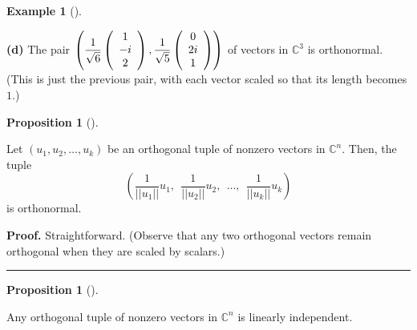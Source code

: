 \documentclass[numbers=enddot,12pt,final,onecolumn,notitlepage]{scrartcl}%
\numberwithin{exer}{subsection}
\theoremstyle{definition}
\newtheorem{prop}[theo]{Proposition}
\newenvironment{proposition}[1][]
{\begin{prop}[#1]\begin{leftbar}}
{\end{leftbar}\end{prop}}
\newtheorem{exam}[theo]{Example}
\newenvironment{example}[1][]
{\begin{exam}[#1]\begin{leftbar}}
{\end{leftbar}\end{exam}}
\newenvironment{proof}[1][Proof]{\noindent\textbf{#1.} }{\ \rule{0.5em}{0.5em}}
\begin{document}
\begin{example}
\textbf{(d)} The pair $\left(  \dfrac{1}{\sqrt{6}}\left(
\begin{array}
[c]{c}%
1\\
-i\\
2
\end{array}
\right)  ,\dfrac{1}{\sqrt{5}}\left(
\begin{array}
[c]{c}%
0\\
2i\\
1
\end{array}
\right)  \right)  $ of vectors in $\mathbb{C}^{3}$ is orthonormal. (This is
just the previous pair, with each vector scaled so that its length becomes $1$.)
\end{example}

\begin{proposition}
\label{prop.unitary.innerprod.orth-norm}Let $\left(  u_{1},u_{2},\ldots
,u_{k}\right)  $ be an orthogonal tuple of nonzero vectors in $\mathbb{C}^{n}%
$. Then, the tuple%
\[
\left(  \dfrac{1}{\left\vert \left\vert u_{1}\right\vert \right\vert }%
u_{1},\ \ \dfrac{1}{\left\vert \left\vert u_{2}\right\vert \right\vert }%
u_{2},\ \ \ldots,\ \ \dfrac{1}{\left\vert \left\vert u_{k}\right\vert
\right\vert }u_{k}\right)
\]
is orthonormal.
\end{proposition}

\begin{proof}
Straightforward. (Observe that any two orthogonal vectors remain orthogonal
when they are scaled by scalars.)
\end{proof}

\begin{proposition}
\label{prop.unitary.orthog.indep}Any orthogonal tuple of nonzero vectors in
$\mathbb{C}^{n}$ is linearly independent.
\end{proposition}
\end{document}
